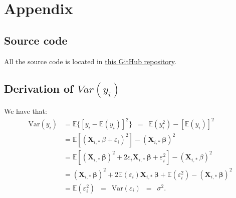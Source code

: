 \documentclass[../main.tex]{subfiles}
\begin{document}
\section{Appendix}
\subsection{Source code}\label{app:source_code}
All the source code is located in \href{https://github.uio.no/Jonnyai/FYS-STK4155}{this GitHub repository}.

\subsection{Derivation of $Var(y_i)$}\label{app:Variance_y_i}
We have that:
\begin{align*} \mbox{Var}(y_i) & = \mathbb{E} \{ [y_i
- \mathbb{E}(y_i)]^2 \} \, \, \, = \, \, \, \mathbb{E} ( y_i^2 ) -
[\mathbb{E}(y_i)]^2  \\  & = \mathbb{E} [ ( \mathbf{X}_{i, \ast} \,
\beta + \varepsilon_i )^2] - ( \mathbf{X}_{i, \ast} \, \boldsymbol{\beta})^2 \\ &
= \mathbb{E} [ ( \mathbf{X}_{i, \ast} \, \boldsymbol{\beta})^2 + 2 \varepsilon_i
\mathbf{X}_{i, \ast} \, \boldsymbol{\beta} + \varepsilon_i^2 ] - ( \mathbf{X}_{i,
\ast} \, \beta)^2 \\  & = ( \mathbf{X}_{i, \ast} \, \boldsymbol{\beta})^2 + 2
\mathbb{E}(\varepsilon_i) \mathbf{X}_{i, \ast} \, \boldsymbol{\beta} +
\mathbb{E}(\varepsilon_i^2 ) - ( \mathbf{X}_{i, \ast} \, \boldsymbol{\beta})^2 
\\ & = \mathbb{E}(\varepsilon_i^2 ) \, \, \, = \, \, \,
\mbox{Var}(\varepsilon_i) \, \, \, = \, \, \, \sigma^2.  
\end{align*}
\end{document}
